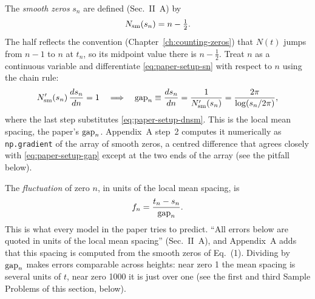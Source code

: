 The \emph{smooth zeros} $s_n$ are defined (Sec.~II~A) by
\begin{equation}
N_{\mathrm{sm}}(s_n)=n-\tfrac12 .
\label{eq:paper-setup-sn}
\end{equation}
The half reflects the convention (Chapter~\ref{ch:counting-zeros}) that $N(t)$ jumps from $n-1$ to $n$ at $t_n$, so its midpoint value there is $n-\tfrac12$. Treat $n$ as a continuous variable and differentiate \eqref{eq:paper-setup-sn} with respect to $n$ using the chain rule:
\begin{equation}
N_{\mathrm{sm}}'(s_n)\,\frac{ds_n}{dn}=1
\quad\Longrightarrow\quad
\mathrm{gap}_n\equiv\frac{ds_n}{dn}=\frac{1}{N_{\mathrm{sm}}'(s_n)}=\frac{2\pi}{\log(s_n/2\pi)} ,
\label{eq:paper-setup-gap}
\end{equation}
where the last step substitutes \eqref{eq:paper-setup-dnsm}. This is the local mean spacing, the paper's $\mathrm{gap}_n$. Appendix~A step~2 computes it numerically as \texttt{np.gradient} of the array of smooth zeros, a centred difference that agrees closely with \eqref{eq:paper-setup-gap} except at the two ends of the array (see the pitfall below).

The \emph{fluctuation} of zero $n$, in units of the local mean spacing, is
\begin{equation}
f_n=\frac{t_n-s_n}{\mathrm{gap}_n}.
\label{eq:paper-setup-fluct}
\end{equation}
This is what every model in the paper tries to predict. ``All errors below are quoted in units of the local mean spacing'' (Sec.~II~A), and Appendix~A adds that this spacing is computed from the smooth zeros of Eq.~(1). Dividing by $\mathrm{gap}_n$ makes errors comparable across heights: near zero 1 the mean spacing is several units of $t$, near zero 1000 it is just over one (see the first and third Sample Problems of this section, below).

